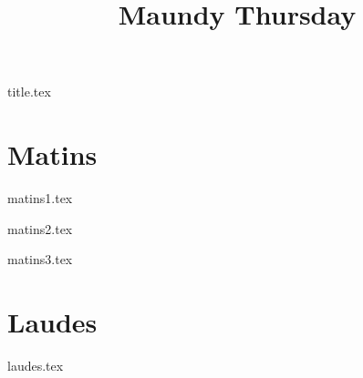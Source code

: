 \documentclass[statementpaper,10pt,openright,openbib]{memoir}
\title{Maundy Thursday}
\begin{document}

{title.tex}

\frontmatter

\mainmatter

\chapter*{Matins}

{matins1.tex}

{matins2.tex}

{matins3.tex}

\chapter*{Laudes}

{laudes.tex}
\end{document}
